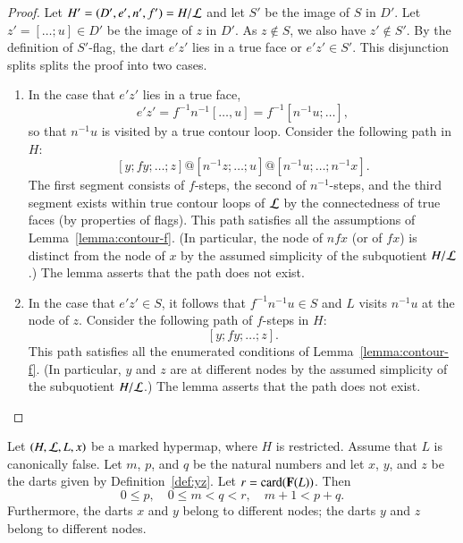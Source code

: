 \begin{proof}
  Let $H' = (D',e',n',f') = H/{\cal L}$ and let $S'$ be the image of
  $S$ in $D'$.  Let $z' = [\ldots;u]\in D'$ be the image of $z$ in
  $D'$.  As $z\not\in S$, we also have $z'\not\in S'$.  By the
  definition of $S'$-flag, the dart $e'z'$ lies in a true face or
  $e'z'\in S'$.  This disjunction splits splits the proof into two
  cases.
\begin{enumerate}
\item In the case that $e'z'$ lies in a true face, 
\[ 
e'z' = f^{-1} n^{-1} [\ldots,u] = f^{-1} [n^{-1}u;\ldots],
\] 
so that $n^{-1} u$ is visited by a true contour loop.
Consider the following
path in $H$:
\[ 
[y;fy;\ldots;z] @ [n^{-1}z;\ldots;u] @ [n^{-1} u;\ldots;n^{-1} x].
\] 
The first segment consists of $f$-steps, the second of $n^{-1}$-steps,
and the third segment exists within true contour loops of ${\cal L}$
by the connectedness of true faces (by properties of flags).  This
path satisfies all the assumptions of Lemma~\ref{lemma:contour-f}.
(In particular, the node of $n f x$ (or of $f x$) is distinct from the
node of $x$ by the assumed simplicity of the subquotient $H/{\cal
  L}$.)  The lemma asserts that the path does not exist.
\item 
In the case that $e'z'\in S$,  it follows that
$f^{-1}n^{-1}u \in S$ and $L$ visits $n^{-1} u$ at the node of $z$.
Consider the following path of $f$-steps in $H$:
\[ 
[y;f y;\ldots;z].
\] 
This path satisfies all the enumerated conditions of
Lemma~\ref{lemma:contour-f}.  (In particular, $y$ and $z$ are at
different nodes by the assumed simplicity of the subquotient $H/{\cal
  L}$.)  The lemma asserts that the path does not exist.
\end{enumerate}
\end{proof}

\begin{lemma}[parameters]\label{lemma:parameters}
Let $(H,{\cal L},L,x)$ be a
marked hypermap, where $H$ is restricted. Assume that $L$ is canonically false.
Let $m$, $p$, and $q$ be the natural numbers and let $x$, $y$, and $z$ be the darts given by
Definition~\ref{def:yz}.  Let $r = {\operatorname{card}}({\mathbf F}(L))$.  Then
\[ 
0\le p,\quad 0\le m < q < r,\quad m+1 < p+q.
\] 
Furthermore, the darts $x$ and $y$ belong to different nodes; the darts
$y$ and $z$ belong to different nodes.
\end{lemma}

